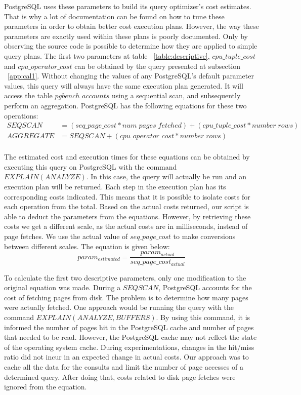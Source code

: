 PostgreSQL uses these parameters to build its query optimizer's cost estimates. That is why a lot of documentation can be found on how to tune these parameters in order to obtain better cost execution plans. However, the way these parameters are exactly used within these plans is poorly documented. Only by observing the source code is possible to determine how they are applied to simple query plans. The first two parameters at table ~\ref{table:descriptive}, $cpu\_tuple\_cost$ and $cpu\_operator\_cost$ can be obtained by the query presented at subsection ~\ref{app:cal1}. Without changing the values of any PostgreSQL's default parameter values, this query will always have the same execution plan generated. It will access the table $pgbench\_accounts$ using a sequential scan, and subsequently perform an aggregation. PostgreSQL has the following equations for these two operations:
\begin{equation}
  \begin{split}
      SEQSCAN &= ( seq\_page\_cost * num\; pages \; fetched ) + ( cpu\_tuple\_cost * number\; rows ) \\
      AGGREGATE &= SEQSCAN + ( cpu\_operator\_cost * number\; rows) \\
  \end{split}
\end{equation}

The estimated cost and execution times for these equations can be obtained by executing this query on PostgreSQL with the command $EXPLAIN (ANALYZE)$. In this case, the query will actually be run and an execution plan will be returned. Each step in the execution plan has its corresponding costs indicated. This means that it is possible to isolate costs for each operation from the total. Based on the actual costs returned, our script is able to deduct the parameters from the equations. However, by retrieving these costs we get a different scale, as the actual costs are in milliseconds, instead of page fetches. We use the actual value of $seq\_page\_cost$ to make conversions between different scales. The equation is given below:
\[
 param_{estimated} = \frac{param_{actual}}{seq\_page\_cost_{actual}}
\]

To calculate the first two descriptive parameters, only one modification to the original equation was made. During a $SEQSCAN$, PostgreSQL accounts for the cost of fetching pages from disk. The problem is to determine how many pages were actually fetched. One approach would be running the query with the command $EXPLAIN (ANALYZE,BUFFERS)$. By using this command, it is informed the number of pages hit in the PostgreSQL cache and number of pages that needed to be read. However, the PostgreSQL cache may not reflect the state of the operating system cache. During experimentations, changes in the hit/miss ratio did not incur in an expected change in actual costs. Our approach was to cache all the data for the consults and limit the number of page accesses of a determined query. After doing that, costs related to disk page fetches were ignored from the equation.

